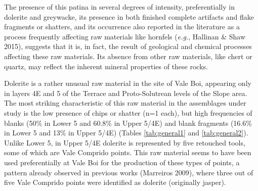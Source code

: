 \documentclass[12pt,twoside]{reedthesis}
\begin{document}
The presence of this patina in several degrees of intensity, preferentially in dolerite and greywacke, its presence in both finished complete artifacts and flake fragments or shatters, and its occurrence also reported in the literature as a process frequently affecting raw materials like hornfels (\emph{e.g.}, Hallinan \& Shaw 2015), suggests that it is, in fact, the result of geological and chemical processes affecting these raw materials. Its absence from other raw materials, like chert or quartz, may reflect the inherent mineral properties of these rocks.

Dolerite is a rather unusual raw material in the site of Vale Boi, appearing only in layers 4E and 5 of the Terrace and Proto-Solutrean levels of the Slope area. The most striking characteristic of this raw material in the assemblages under study is the low presence of chips or shatter (n=1 each), but high frequencies of blanks (50\% in Lower 5 and 60.8\% in Upper 5/4E) and blank fragments (16.6\% in Lower 5 and 13\% in Upper 5/4E) (Tables \ref{tab:general1} and \ref{tab:general2}). Unlike Lower 5, in Upper 5/4E dolerite is represented by five retouched tools, some of which are Vale Comprido points. This raw material seems to have been used preferentially at Vale Boi for the production of these types of points, a pattern already observed in previous works (Marreiros 2009), where three out of five Vale Comprido points were identified as dolerite (originally jasper).
\end{document}
